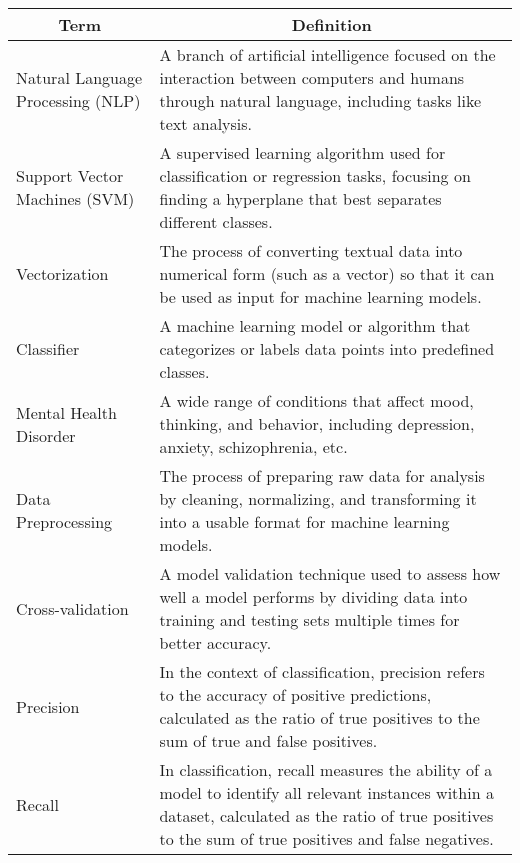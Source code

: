 \begin{center}

\begin{tabular}{|p{4cm}|p{10cm}|}
  \hline
  \multicolumn{1}{|c|}{\textbf{Term}} & \multicolumn{1}{c|}{\textbf{Definition}} \\

  \hline 
  Natural Language Processing (NLP) & A branch of artificial intelligence focused on the interaction between computers and humans through natural language, including tasks like text analysis. \\

  \hline 
  Support Vector Machines (SVM) & A supervised learning algorithm used for classification or regression tasks, focusing on finding a hyperplane that best separates different classes. \\

  \hline 
  Vectorization & The process of converting textual data into numerical form (such as a vector) so that it can be used as input for machine learning models. \\

  \hline 
  Classifier & A machine learning model or algorithm that categorizes or labels data points into predefined classes. \\

  \hline
  Mental Health Disorder & A wide range of conditions that affect mood, thinking, and behavior, including depression, anxiety, schizophrenia, etc. \\

  \hline
  Data Preprocessing & The process of preparing raw data for analysis by cleaning, normalizing, and transforming it into a usable format for machine learning models. \\

  \hline 
  Cross-validation & A model validation technique used to assess how well a model performs by dividing data into training and testing sets multiple times for better accuracy. \\

  \hline
  Precision & In the context of classification, precision refers to the accuracy of positive predictions, calculated as the ratio of true positives to the sum of true and false positives. \\

  \hline
  Recall & In classification, recall measures the ability of a model to identify all relevant instances within a dataset, calculated as the ratio of true positives to the sum of true positives and false negatives. \\
  

\end{tabular}
\end{center}
